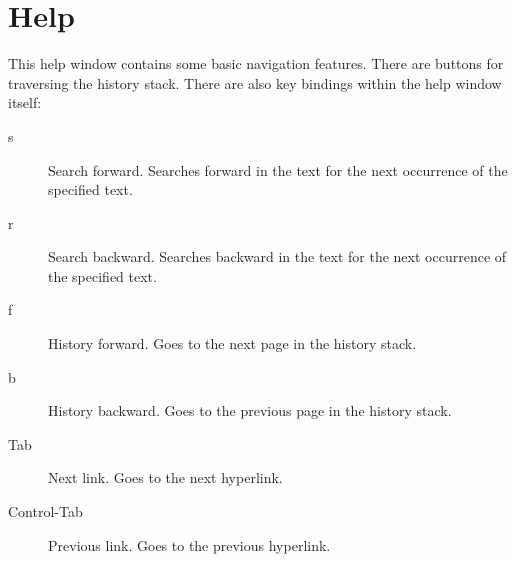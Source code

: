 \chapter{Help}

This help window contains some basic navigation features.  There are
buttons for traversing the history stack.  There are also key bindings
within the help window itself:

\begin{description}
\item[s] Search forward.  Searches forward in the text for the next
occurrence of the specified text.
\item[r] Search backward.  Searches backward in the text for the next
occurrence of the specified text.
\item[f] History forward.  Goes to the next page in the history stack.
\item[b] History backward. Goes to the previous page in the history
stack.
\item[Tab] Next link. Goes to the next hyperlink.
\item[Control-Tab] Previous link. Goes to the previous hyperlink.
\end{description}



